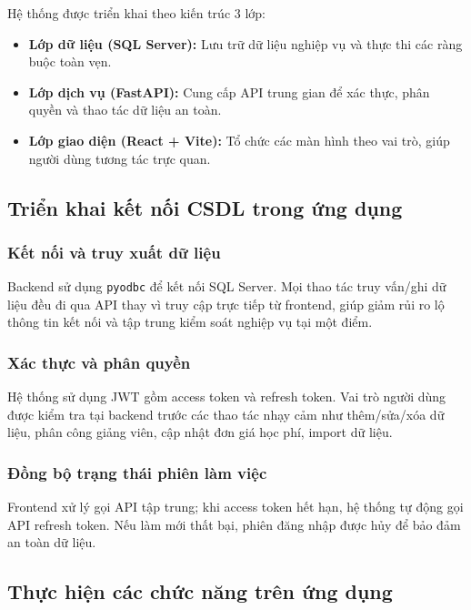 \documentclass[13pt, a4paper]{article}
\begin{document}
\vspace{0.3cm}
\noindent Hệ thống được triển khai theo kiến trúc 3 lớp:
\begin{itemize}[leftmargin=1.5cm]
  \item \textbf{Lớp dữ liệu (SQL Server):} Lưu trữ dữ liệu nghiệp vụ và thực thi các ràng buộc toàn vẹn.
  \item \textbf{Lớp dịch vụ (FastAPI):} Cung cấp API trung gian để xác thực, phân quyền và thao tác dữ liệu an toàn.
  \item \textbf{Lớp giao diện (React + Vite):} Tổ chức các màn hình theo vai trò, giúp người dùng tương tác trực quan.
\end{itemize}

\subsection{Triển khai kết nối CSDL trong ứng dụng}

\subsubsection{Kết nối và truy xuất dữ liệu}
\noindent Backend sử dụng \texttt{pyodbc} để kết nối SQL Server. Mọi thao tác truy vấn/ghi dữ liệu đều đi qua API thay vì truy cập trực tiếp từ frontend, giúp giảm rủi ro lộ thông tin kết nối và tập trung kiểm soát nghiệp vụ tại một điểm.

\subsubsection{Xác thực và phân quyền}
\noindent Hệ thống sử dụng JWT gồm access token và refresh token. Vai trò người dùng được kiểm tra tại backend trước các thao tác nhạy cảm như thêm/sửa/xóa dữ liệu, phân công giảng viên, cập nhật đơn giá học phí, import dữ liệu.

\subsubsection{Đồng bộ trạng thái phiên làm việc}
\noindent Frontend xử lý gọi API tập trung; khi access token hết hạn, hệ thống tự động gọi API refresh token. Nếu làm mới thất bại, phiên đăng nhập được hủy để bảo đảm an toàn dữ liệu.

\subsection{Thực hiện các chức năng trên ứng dụng}
\end{document}
